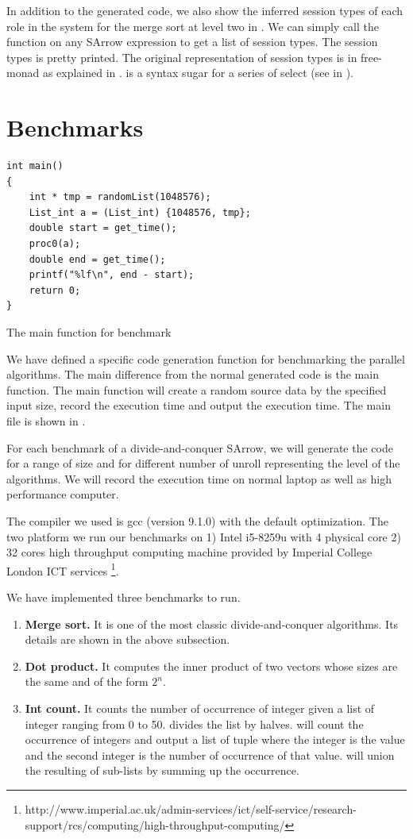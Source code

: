 In addition to the generated code, we also show the inferred session types of each role in the system for the merge sort at level two in . We can simply call the function  on any SArrow expression to get a list of session types. The session types is pretty printed. The original representation of session types is in free-monad as explained in .  is a syntax sugar for a series of select (see in ).

\section{Benchmarks}
\begin{listing}[ht]
\begin{verbatim}
int main()
{
    int * tmp = randomList(1048576);
    List_int a = (List_int) {1048576, tmp};
    double start = get_time();
    proc0(a);
    double end = get_time();
    printf("%lf\n", end - start);
    return 0;
}
\end{verbatim}
    \caption{The main function for benchmark}
    \label{eval:code:main}
\end{listing}
We have defined a specific code generation function for benchmarking the parallel algorithms. The main difference from the normal generated code is the main function. The main function will create a random source data by the specified input size, record the execution time and output the execution time. The main file is shown in . 

For each benchmark of a divide-and-conquer SArrow, we will generate the code for a range of size and for different number of unroll representing the level of the algorithms. We will record the execution time on normal laptop as well as high performance computer.

The compiler we used is gcc (version 9.1.0) with the default optimization. The two platform we run our benchmarks on 1) Intel i5-8259u with 4 physical core 2) 32 cores high throughput computing machine provided by Imperial College London ICT services \footnote{http://www.imperial.ac.uk/admin-services/ict/self-service/research-support/rcs/computing/high-throughput-computing/}.

We have implemented three benchmarks to run.
\begin{enumerate}
    \item \textbf{Merge sort. } It is one of the most classic divide-and-conquer algorithms. Its details are shown in the above subsection.
    \item \textbf{Dot product. } It computes the inner product of two vectors whose sizes are the same and of the form $2^n$.
    \item \textbf{Int count. } It counts the number of occurrence of integer given a list of integer ranging from 0 to 50.  divides the list by halves.  will count the occurrence of integers and output a list of tuple where the integer is the value and the second integer is the number of occurrence of that value.  will union the resulting of sub-lists by summing up the occurrence.
\end{enumerate}
